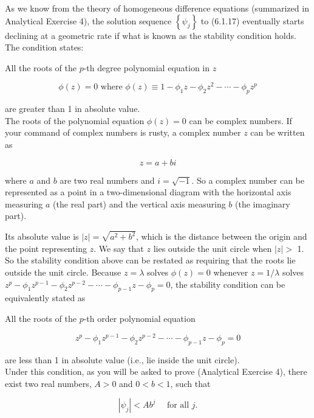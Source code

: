 \documentclass[10pt]{article}
\begin{document}
As we know from the theory of homogeneous difference equations (summarized in Analytical Exercise 4), the solution sequence $\left\{\psi_{j}\right\}$ to (6.1.17) eventually starts declining at a geometric rate if what is known as the stability condition holds. The condition states:

All the roots of the $p$-th degree polynomial equation in $z$


\begin{equation*}
\phi(z)=0 \text { where } \phi(z) \equiv 1-\phi_{1} z-\phi_{2} z^{2}-\cdots-\phi_{p} z^{p} \tag{6.1.18}
\end{equation*}


are greater than 1 in absolute value.\\
The roots of the polynomial equation $\phi(z)=0$ can be complex numbers. If your command of complex numbers is rusty, a complex number $z$ can be written as

$$
z=a+b i
$$

where $a$ and $b$ are two real numbers and $i=\sqrt{-1}$. So a complex number can be represented as a point in a two-dimensional diagram with the horizontal axis measuring $a$ (the real part) and the vertical axis measuring $b$ (the imaginary part).

Its absolute value is $|z|=\sqrt{a^{2}+b^{2}}$, which is the distance between the origin and the point representing $z$. We say that $z$ lies outside the unit circle when $|z|>$ 1. So the stability condition above can be restated as requiring that the roots lie outside the unit circle. Because $z=\lambda$ solves $\phi(z)=0$ whenever $z=1 / \lambda$ solves $z^{p}-\phi_{1} z^{p-1}-\phi_{2} z^{p-2}-\cdots-\phi_{p-1} z-\phi_{p}=0$, the stability condition can be equivalently stated as

All the roots of the $p$-th order polynomial equation


\begin{equation*}
z^{p}-\phi_{1} z^{p-1}-\phi_{2} z^{p-2}-\cdots-\phi_{p-1} z-\phi_{p}=0 \tag{$\prime$}
\end{equation*}


are less than 1 in absolute value (i.e., lie inside the unit circle).\\
Under this condition, as you will be asked to prove (Analytical Exercise 4), there exist two real numbers, $A>0$ and $0<b<1$, such that


\begin{equation*}
\left|\psi_{j}\right|<A b^{j} \quad \text { for all } j . \tag{6.1.19}
\end{equation*}
\end{document}
